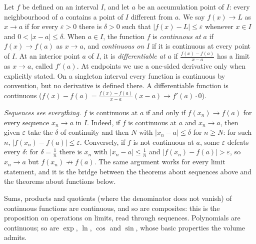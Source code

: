 \begin{reminder}
Let $f$ be defined on an interval $I$, and let $a$ be an accumulation point of
$I$: every neighbourhood of $a$ contains a point of $I$ different from $a$.
We say $f(x)\to L$ as $x\to a$ if for every $\varepsilon>0$ there is $\delta>0$ such that
$|f(x)-L|\le\varepsilon$ whenever $x\in I$ and $0<|x-a|\le\delta$. When $a\in I$, the function $f$ is \emph{continuous at $a$} if
$f(x)\to f(a)$ as $x\to a$, and
\emph{continuous on $I$} if it is continuous at every point of $I$. At an interior point $a$ of $I$, it is \emph{differentiable at $a$} if $\frac{f(x)-f(a)}{x-a}$ has a limit as
$x\to a$, called $f'(a)$. At endpoints we use a one-sided derivative only when explicitly
stated. On a singleton interval every function is continuous by convention,
but no derivative is defined there. A differentiable function is continuous ($f(x)-f(a)=\frac{f(x)-f(a)}{x-a}(x-a)\to f'(a)\cdot0$).

\emph{Sequences see everything.} $f$ is continuous at $a$ if and only if $f(x_n)\to f(a)$ for every sequence $x_n\to a$ in $I$. Indeed, if $f$ is continuous
at $a$ and $x_n\to a$, then given $\varepsilon$ take the $\delta$ of continuity and then $N$ with $|x_n-a|\le\delta$ for $n\ge N$: for such $n$,
$|f(x_n)-f(a)|\le\varepsilon$. Conversely, if $f$ is not continuous at $a$, some $\varepsilon$ defeats every $\delta$: for $\delta=\frac1n$ there is $x_n$
with $|x_n-a|\le\frac1n$ and $|f(x_n)-f(a)|>\varepsilon$, so $x_n\to a$ but $f(x_n)\not\to f(a)$. The same argument works for every limit statement, and
it is the bridge between the theorems about sequences above and the theorems about functions below.

Sums, products and quotients (where the denominator does not vanish) of continuous functions are continuous, and so are composites: this is the
proposition on operations on limits, read through sequences. Polynomials are continuous; so are $\exp$, $\ln$, $\cos$ and $\sin$, whose basic
properties the volume admits.
\end{reminder}

